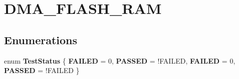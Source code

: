 \hypertarget{group___d_m_a___f_l_a_s_h___r_a_m}{\section{D\-M\-A\-\_\-\-F\-L\-A\-S\-H\-\_\-\-R\-A\-M}
\label{group___d_m_a___f_l_a_s_h___r_a_m}
}
\subsection*{Enumerations}
\begin{DoxyCompactItemize}
\item 
enum {\bfseries Test\-Status} \{ {\bfseries F\-A\-I\-L\-E\-D} = 0, 
{\bfseries P\-A\-S\-S\-E\-D} = !\-F\-A\-I\-L\-E\-D, 
{\bfseries F\-A\-I\-L\-E\-D} = 0, 
{\bfseries P\-A\-S\-S\-E\-D} = !\-F\-A\-I\-L\-E\-D
 \}
\end{DoxyCompactItemize}
